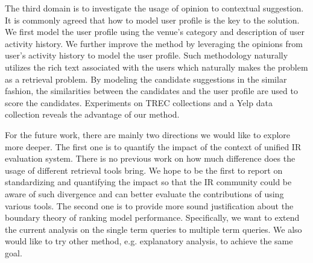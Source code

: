 The third domain is to investigate the usage of opinion to contextual 
suggestion. It is commonly agreed that how to model user profile is the key 
to the solution. We first model the user profile using the venue's category 
and description of user activity history. We further improve the 
method by leveraging the opinions from user's activity history to model the 
user profile. Such methodology naturally utilizes the rich text associated 
with the users which naturally makes the problem as a retrieval problem. 
By modeling the candidate suggestions in the similar fashion, 
the similarities between the candidates and the user profile are used to score 
the candidates. Experiments on TREC collections and a 
Yelp data collection reveals the advantage of our method.

For the future work, there are mainly two directions we would like to explore more deeper. 
The first one is to quantify the impact of the context of unified 
IR evaluation system. There is no previous work on how much difference does 
the usage of different retrieval tools bring.
We hope to be the first to report on standardizing and quantifying the 
impact so that the IR community could be aware of such divergence and can 
better evaluate the contributions of using various tools. 
The second one is to provide more sound justification about the boundary 
theory of ranking model performance. Specifically, we want to extend the 
current analysis on the single term queries to multiple term queries. 
We also would like to try other method, e.g. explanatory analysis, 
to achieve the same goal.
















